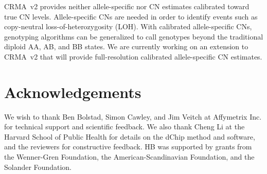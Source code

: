 \documentclass{bioinfo}
\begin{document}
CRMA~v2 provides neither allele-specific nor CN estimates calibrated toward true CN levels.  Allele-specific CNs are needed in order to identify events such as copy-neutral loss-of-heterozygosity (LOH).  With calibrated allele-specific CNs, genotyping algorithms can be generalized to call genotypes beyond the traditional diploid AA, AB, and BB states.  We are currently working on an extension to CRMA~v2 that will provide full-resolution calibrated allele-specific CN estimates.

  

   

\section*{Acknowledgements}
We wish to thank Ben Bolstad, Simon Cawley, and Jim Veitch at Affymetrix Inc. for technical support and scientific feedback.
We also thank Cheng Li at the Harvard School of Public Health for details on the dChip method and software, and the reviewers for constructive feedback.
HB was supported by grants from the Wenner-Gren Foundation, the American-Scandinavian Foundation, and the Solander Foundation.\\[1ex]



\begin{methods}


\end{methods} 

\end{document}
